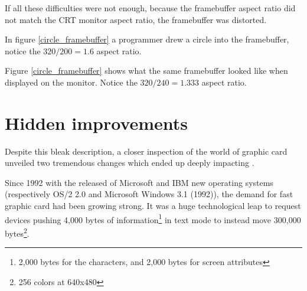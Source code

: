 \par
{}
\par
If all these difficulties were not enough, because the framebuffer aspect ratio did not match the CRT monitor aspect ratio, the framebuffer was distorted.\\
\par
{}
\par
In figure \ref{circle_framebuffer} a programmer drew a circle into the framebuffer, notice the $ 320/200 = 1.6 $ aspect ratio.
\par
{}
\par
Figure \ref{circle_framebuffer} shows what the same framebuffer looked like when displayed on the monitor. Notice the $ 320/240 = 1.333 $ aspect ratio.\\







\section{Hidden improvements}
Despite this bleak description, a closer inspection of the world of graphic card unveiled two tremendous changes which ended up deeply impacting \doom. \\
\par
Since 1992 with the released of Microsoft and IBM new operating systems (respectively OS/2 2.0 and Microsoft Windows 3.1 (1992)), the demand for fast graphic card had been growing strong. It was a huge technological leap to request devices pushing 4,000 bytes of information\footnote{2,000 bytes for the characters, and 2,000 bytes for screen attributes} in text mode to instead move 300,000 bytes\footnote{256 colors at 640x480}.\\
\par




